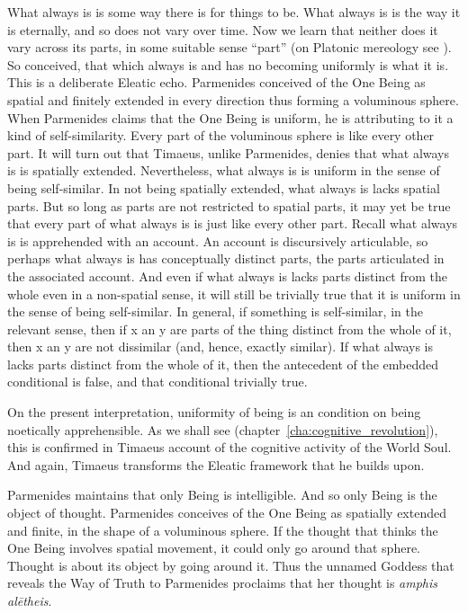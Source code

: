 What always is is some way there is for things to be. What always is is the way it is eternally, and so does not vary over time. Now we learn that neither does it vary across its parts, in some suitable sense ``part'' (on Platonic mereology see \citealt{Harte:2002tl}). So conceived, that which always is and has no becoming uniformly is what it is. This is a deliberate Eleatic echo. Parmenides conceived of the One Being as spatial and finitely extended in every direction thus forming a voluminous sphere. When Parmenides claims that the One Being is uniform, he is attributing to it a kind of self-similarity. Every part of the voluminous sphere is like every other part. It will turn out that Timaeus, unlike Parmenides, denies that what always is is spatially extended. Nevertheless, what always is is uniform in the sense of being self-similar. In not being spatially extended, what always is lacks spatial parts. But so long as parts are not restricted to spatial parts, it may yet be true that every part of what always is is just like every other part. Recall what always is is apprehended with an account. An account is discursively articulable, so perhaps what always is has conceptually distinct parts, the parts articulated in the associated account. And even if what always is lacks parts distinct from the whole even in a non-spatial sense, it will still be trivially true that it is uniform in the sense of being self-similar. In general, if something is self-similar, in the relevant sense, then if x an y are parts of the thing distinct from the whole of it, then x an y are not dissimilar (and, hence, exactly similar). If what always is lacks parts distinct from the whole of it, then the antecedent of the embedded conditional is false, and that conditional trivially true.

On the present interpretation, uniformity of being is an condition on being noetically apprehensible. As we shall see (chapter~\ref{cha:cognitive_revolution}), this is confirmed in Timaeus account of the cognitive activity of the World Soul. And again, Timaeus transforms the Eleatic framework that he builds upon. 

Parmenides maintains that only Being is intelligible. And so only Being is the object of thought. Parmenides conceives of the One Being as spatially extended and finite, in the shape of a voluminous sphere. If the thought that thinks the One Being involves spatial movement, it could only go around that sphere. Thought is about its object by going around it. Thus the unnamed Goddess that reveals the Way of Truth to Parmenides proclaims that her thought is \emph{amphis alētheis}.

